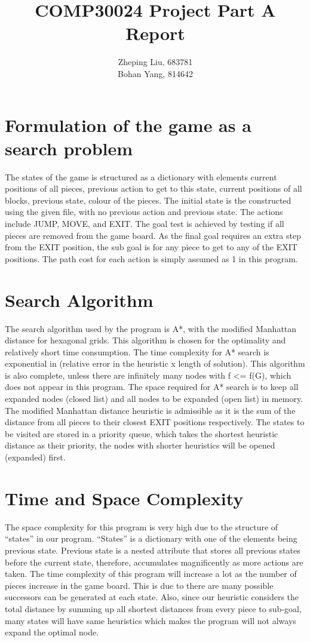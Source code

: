 \documentclass[UTF8,12pt]{article}
\title{COMP30024 Project Part A \\
       Report}
\author{Zheping Liu, 683781 \\
        Bohan Yang, 814642}
\date{}
\begin{document}
    \maketitle
    \section{Formulation of the game as a search problem}
    The states of the game is structured as a dictionary with 
    elements {current positions of all pieces, previous action 
    to get to this state, current positions of all blocks, 
    previous state, colour of the pieces}.
    The initial state is the constructed using the given file, with no previous
    action and previous state.
    The actions include JUMP, MOVE, and EXIT. 
    The goal test is achieved by testing if all pieces are removed 
    from the game board. 
    As the final goal requires an extra step from the EXIT position, 
    the sub goal is for any piece to get to any of the EXIT positions. 
    The path cost for each action is simply assumed as 1 in this program.

    \section{Search Algorithm}
    The search algorithm used by the program is A*, with the modified 
    Manhattan distance for hexagonal grids. This algorithm is chosen for 
    the optimality and relatively short time consumption. 
    The time complexity for A* search is exponential in (relative error in 
    the heuristic x length of solution). 
    This algorithm is also complete, unless there are infinitely many nodes with f <= f(G), 
    which does not appear in this program. 
    The space required for A* search is to keep all expanded nodes (closed list)
    and all nodes to be expanded (open list) in memory.
    The modified Manhattan distance heuristic is admissible as it is the sum of 
    the distance from all pieces to their closest EXIT positions respectively. 
    The states to be visited are stored in a priority queue, which takes the 
    shortest heuristic distance as their priority, the nodes with shorter heuristics
    will be opened (expanded) first.

    \section{Time and Space Complexity}
    The space complexity for this program is very high due to the structure of 
    “states” in our program. “States” is a dictionary with one of the elements 
    being previous state. Previous state is a nested attribute that stores all previous states before 
    the current state, therefore, accumulates magnificently as more actions are taken. 
    The time complexity of this program will increase a lot as the number of pieces
    increase in the game board. This is due to there are many possible successors
    can be generated at each state. Also, since our heuristic considers the total
    distance by summing up all shortest distances from every piece to sub-goal,
    many states will have same heuristics which makes the program will not always
    expand the optimal node.
\end{document}
